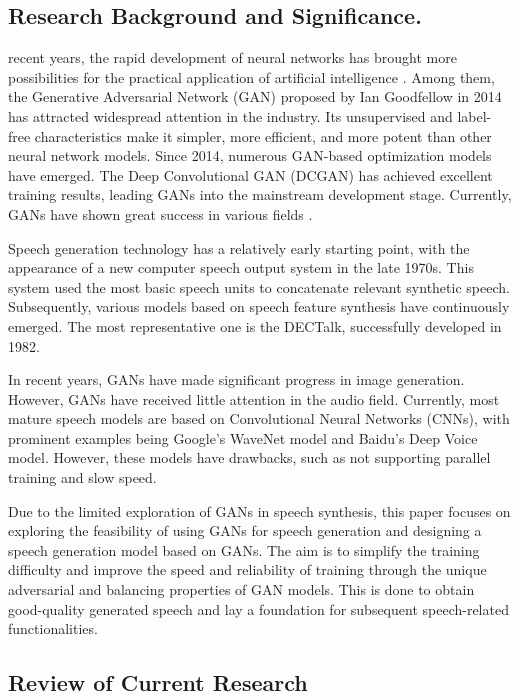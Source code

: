 \documentclass[10pt,journal,compsoc]{IEEEtran}
\begin{document}
\subsection{Research Background and Significance.}

 recent years, the rapid development of neural networks has brought more possibilities for the practical application of artificial intelligence \cite{1}. Among them, the Generative Adversarial Network (GAN) proposed by Ian Goodfellow in 2014 has attracted widespread attention in the industry. Its unsupervised and label-free characteristics make it simpler, more efficient, and more potent than other neural network models. Since 2014, numerous GAN-based optimization models have emerged. The Deep Convolutional GAN (DCGAN) has achieved excellent training results, leading GANs into the mainstream development stage. Currently, GANs have shown great success in various fields \cite{2}.

Speech generation technology has a relatively early starting point, with the appearance of a new computer speech output system in the late 1970s. This system used the most basic speech units to concatenate relevant synthetic speech. Subsequently, various models based on speech feature synthesis have continuously emerged. The most representative one is the DECTalk, successfully developed in 1982.

In recent years, GANs have made significant progress in image generation. However, GANs have received little attention in the audio field. Currently, most mature speech models are based on Convolutional Neural Networks (CNNs), with prominent examples being Google's WaveNet \cite{3} model and Baidu's Deep Voice model. However, these models have drawbacks, such as not supporting parallel training and slow speed.

Due to the limited exploration of GANs in speech synthesis, this paper focuses on exploring the feasibility of using GANs for speech generation and designing a speech generation model based on GANs. The aim is to simplify the training difficulty and improve the speed and reliability of training through the unique adversarial and balancing properties of GAN models. This is done to obtain good-quality generated speech and lay a foundation for subsequent speech-related functionalities.

\subsection{Review of Current Research}
\end{document}
